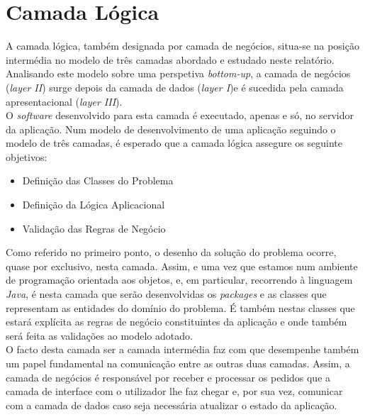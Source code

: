 \section{Camada Lógica}

A camada lógica, também designada por camada de negócios, situa-se na posição intermédia no modelo de três camadas abordado e estudado neste relatório.
Analisando este modelo sobre uma perspetiva \textit{bottom-up}, a camada de negócios (\textit{layer II}) surge depois da camada de dados (\textit{layer I})e é sucedida pela camada apresentacional (\textit{layer III}).\\

O \textit{software} desenvolvido para esta camada é executado, apenas e só, no servidor da aplicação.
Num modelo de desenvolvimento de uma aplicação seguindo o modelo de três camadas, é esperado que a camada lógica assegure os seguinte objetivos:

\begin{itemize}

\item
Definição das Classes do Problema

\item
Definição da Lógica Aplicacional

\item
Validação das Regras de Negócio

\end{itemize}

Como referido no primeiro ponto, o desenho da solução do problema ocorre, quase por exclusivo, nesta camada.
Assim, e uma vez que estamos num ambiente de programação orientada aos objetos, e, em particular, recorrendo à linguagem \textit{Java}, é nesta camada que serão desenvolvidas os \textit{packages} e as classes que representam as entidades do domínio do problema.
É também nestas classes que estará explícita as regras de negócio constituintes da aplicação e onde também será feita as validações ao modelo adotado.\\

O facto desta camada ser a camada intermédia faz com que desempenhe também um papel fundamental na comunicação entre as outras duas camadas.
Assim, a camada de negócios é responsável por receber e processar os pedidos que a camada de interface com o utilizador lhe faz chegar e, por sua vez, comunicar com a camada de dados caso seja necessária atualizar o estado da aplicação.\\

